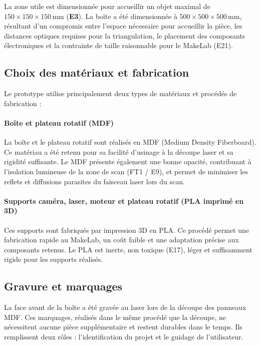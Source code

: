 La zone utile est dimensionnée pour accueillir un objet maximal de
$150\times150\times150$\,mm (\textbf{E3}). La boîte a été dimensionnée
à $500\times500\times500$\,mm, résultant d'un compromis entre l'espace
nécessaire pour accueillir la pièce, les distances optiques requises
pour la triangulation, le placement des composants électroniques et la
contrainte de taille raisonnable pour le MakeLab (E21).

\subsection{Choix des matériaux et fabrication}

Le prototype utilise principalement deux types de matériaux et procédés de
fabrication :

\paragraph{Boîte et plateau rotatif (MDF)}
La boîte et le plateau rotatif sont réalisés en MDF (Medium Density
Fiberboard). Ce matériau a été retenu pour sa facilité d'usinage à la
découpe laser et sa rigidité suffisante. Le MDF présente également une bonne
opacité, contribuant à l'isolation lumineuse de la zone de scan
(FT1 / E9), et permet de minimiser les reflets et diffusions parasites
du faisceau laser lors du scan.

\paragraph{Supports caméra, laser, moteur et plateau rotatif (PLA imprimé en 3D)}
Ces supports sont fabriqués par impression 3D en PLA. Ce procédé permet une
fabrication rapide au MakeLab, un coût faible et une adaptation précise aux
composants retenus. Le PLA est inerte, non toxique (E17), léger et
suffisamment rigide pour les supports réalisés.

\subsection{Gravure et marquages}

La face avant de la boîte a été gravée au laser lors de la découpe des
panneaux MDF. Ces marquages, réalisés dans le même procédé que la
découpe, ne nécessitent aucune pièce supplémentaire et restent durables
dans le temps. Ils remplissent deux rôles : l'identification du projet et
le guidage de l'utilisateur.

